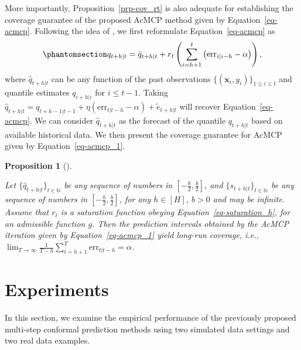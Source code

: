 \documentclass[
  11pt,
  a4paper,
]{article}
\theoremstyle{plain}
\newtheorem{proposition}{Proposition}[section]
\theoremstyle{remark}
\begin{document}
More importantly, Proposition~\ref{prp-cov_rt} is also adequate for
establishing the coverage guarantee of the proposed AcMCP method given
by Equation~\ref{eq-acmcp}. Following the idea of
\textcite{angelopoulos2024}, we first reformulate
Equation~\ref{eq-acmcp} as
\begin{equation}\phantomsection\label{eq-acmcp_1}{
q_{t+h|t}=\hat{q}_{t+h|t}+r_t\left(\sum_{i=h+1}^t \left(\mathrm{err}_{i|i-h}-\alpha\right)\right),
}\end{equation} where \(\hat{q}_{t+h|t}\) can be any function of the
past observations \(\{(\bm{x}_i, y_i)\}_{1 \leq i \leq t}\) and quantile
estimates \(q_{i+h|i}\) for \(i \leq t-1\). Taking
\(\hat{q}_{t+h|t}=q_{t+h-1|t-1}+\eta \left(\mathrm{err}_{t|t-h}-\alpha\right)+\tilde{e}_{t+h|t}\)
will recover Equation~\ref{eq-acmcp}. We can consider
\(\hat{q}_{t+h|t}\) as the forecast of the quantile \(q_{t+h|t}\) based
on available historical data. We then present the coverage guarantee for
AcMCP given by Equation~\ref{eq-acmcp_1}.

\begin{proposition}[]\protect\hypertarget{prp-cov_acmcp}{}\label{prp-cov_acmcp}

Let \(\{\hat{q}_{t+h|t}\}_{t\in\mathbb{N}}\) be any sequence of numbers
in \([-\frac{b}{2}, \frac{b}{2}]\), and
\(\{s_{t+h|t}\}_{t\in\mathbb{N}}\) be any sequence of numbers in
\([-\frac{b}{2},\frac{b}{2}]\), for any \(h\in[H]\), \(b>0\) and may be
infinite. Assume that \(r_t\) is a saturation function obeying
Equation~\ref{eq-saturation_h}, for an admissible function \(g\). Then
the prediction intervals obtained by the AcMCP iteration given by
Equation~\ref{eq-acmcp_1} yield long-run coverage, i.e.,
\(\lim _{T \rightarrow \infty} \frac{1}{T-h} \sum_{t=h+1}^T \mathrm{err}_{t|t-h} = \alpha\).

\end{proposition}

\section{Experiments}\label{experiments}

In this section, we examine the empirical performance of the previously
proposed multi-step conformal prediction methods using two simulated
data settings and two real data examples.
\end{document}
